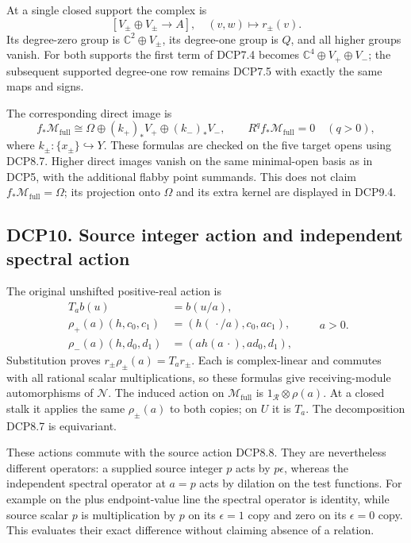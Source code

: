 At a single closed support the complex is \[
 [V_\pm\oplus V_\pm\longrightarrow A],
 \quad(v,w)\longmapsto r_\pm(v).
\tag{DCP9.3}
\] Its degree-zero group is \(\mathbb C^2\oplus V_\pm\), its degree-one
group is \(Q\), and all higher groups vanish. For both supports the
first term of DCP7.4 becomes \(\mathbb C^4\oplus V_+\oplus V_-\); the
subsequent supported degree-one row remains DCP7.5 with exactly the same
maps and signs.

The corresponding direct image is \[
 f_*\mathcal M_{\mathrm{full}}
 \cong\Omega\oplus(k_+)_*V_+\oplus(k_-)_*V_-,
\qquad R^qf_*\mathcal M_{\mathrm{full}}=0\quad(q>0),
\tag{DCP9.4}
\] where \(k_\pm:\{x_\pm\}\hookrightarrow Y\). These formulas are
checked on the five target opens using DCP8.7. Higher direct images
vanish on the same minimal-open basis as in DCP5, with the additional
flabby point summands. This does not claim
\(f_*\mathcal M_{\mathrm{full}}=\Omega\); its projection onto \(\Omega\)
and its extra kernel are displayed in DCP9.4.

\subsection{DCP10. Source integer action and independent spectral
action}\label{dcp10.-source-integer-action-and-independent-spectral-action}

The original unshifted positive-real action is \[
\begin{aligned}
 T_a b(u)&=b(u/a),\\
 \rho_+(a)(h,c_0,c_1)&=(h(\,\cdot/a),c_0,ac_1),\\
 \rho_-(a)(h,d_0,d_1)&=(a h(a\,\cdot),ad_0,d_1),
\end{aligned}
\qquad a>0 .
\tag{DCP10.1}
\] Substitution proves \(r_\pm\rho_\pm(a)=T_a r_\pm\). Each is
complex-linear and commutes with all rational scalar multiplications, so
these formulas give receiving-module automorphisms of \(\mathcal N\).
The induced action on \(\mathcal M_{\mathrm{full}}\) is
\(1_{\mathcal R}\otimes\rho(a)\). At a closed stalk it applies the same
\(\rho_\pm(a)\) to both copies; on \(U\) it is \(T_a\). The
decomposition DCP8.7 is equivariant.

These actions commute with the source action DCP8.8. They are
nevertheless different operators: a supplied source integer \(p\) acts
by \(p\epsilon\), whereas the independent spectral operator at \(a=p\)
acts by dilation on the test functions. For example on the plus
endpoint-value line the spectral operator is identity, while source
scalar \(p\) is multiplication by \(p\) on its \(\epsilon=1\) copy and
zero on its \(\epsilon=0\) copy. This evaluates their exact difference
without claiming absence of a relation.

